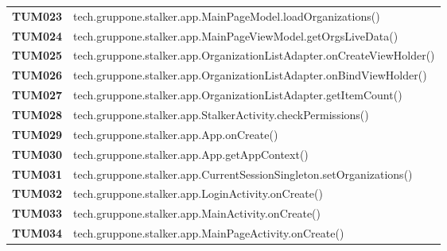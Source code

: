 \documentclass[../../piano-di-qualifica.tex]{subfiles}
\begin{document}
\begin{longtable}[H]{>{\centering\bfseries}m{3cm} >{}m{13cm}}
  TUM023             & tech.gruppone.stalker.app.MainPageModel.loadOrganizations\@()                                           \\

  TUM024             & tech.gruppone.stalker.app.MainPageViewModel.getOrgsLiveData\@()                                         \\

  TUM025             & tech.gruppone.stalker.app.OrganizationListAdapter.onCreateViewHolder\@()                                \\

  TUM026             & tech.gruppone.stalker.app.OrganizationListAdapter.onBindViewHolder\@()                                  \\

  TUM027             & tech.gruppone.stalker.app.OrganizationListAdapter.getItemCount\@()                                      \\

  TUM028             & tech.gruppone.stalker.app.StalkerActivity.checkPermissions\@()                                          \\



  TUM029             & tech.gruppone.stalker.app.App.onCreate\@()                                                              \\

  TUM030             & tech.gruppone.stalker.app.App.getAppContext\@()                                                         \\

  TUM031             & tech.gruppone.stalker.app.CurrentSessionSingleton.setOrganizations\@()                                  \\


  TUM032             & tech.gruppone.stalker.app.LoginActivity.onCreate\@()                                                    \\

  TUM033             & tech.gruppone.stalker.app.MainActivity.onCreate\@()                                                     \\

  TUM034             & tech.gruppone.stalker.app.MainPageActivity.onCreate\@()                                                 \\


\end{longtable}
\end{document}

